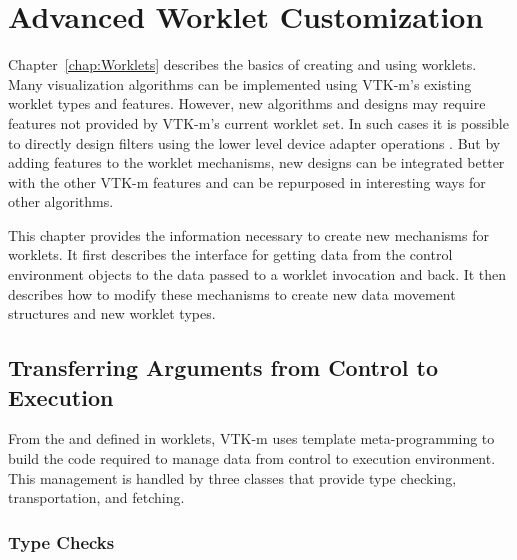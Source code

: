 
\chapter{Advanced Worklet Customization}
\label{chap:AdvancedWorklets}


Chapter~\ref{chap:Worklets} describes the basics of creating and using
worklets. Many visualization algorithms can be implemented using VTK-m's
existing worklet types and features. However, new algorithms and designs
may require features not provided by VTK-m's current worklet set. In such
cases it is possible to directly design filters using the lower level
device adapter operations . But by adding
features to the worklet mechanisms, new designs can be integrated better
with the other VTK-m features and can be repurposed in interesting ways for
other algorithms.

This chapter provides the information necessary to create new mechanisms
for worklets. It first describes the interface for getting data from the
control environment objects to the data passed to a worklet invocation and
back. It then describes how to modify these mechanisms to create new data
movement structures and new worklet types.

\section{Transferring Arguments from Control to Execution}
\label{sec:TransferringArguments}

From the \controlsignature and \executionsignature defined in worklets,
VTK-m uses template meta-programming to build the code required to manage
data from control to execution environment. This management is handled by
three classes that provide type checking, transportation, and fetching.


\subsection{Type Checks}
\label{sec:TypeChecks}

